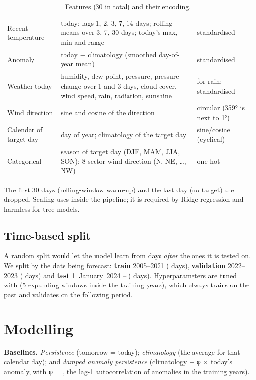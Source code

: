 \begin{table}[H]\centering\small
\caption{Features (30 in total) and their encoding.}\label{ts:tab-features}
\begin{tabularx}{\linewidth}{L{3.5cm}YL{3.4cm}}
\toprule {} &  &  \\ \midrule
Recent temperature & today; lags 1, 2, 3, 7, 14 days; rolling means over 3, 7, 30 days; today's max, min and range & standardised \\
Anomaly & today − climatology (smoothed day-of-year mean) & standardised \\
Weather today & humidity, dew point, pressure, pressure change over 1 and 3 days, cloud cover, wind speed, rain, radiation, sunshine &  for rain; standardised \\
Wind direction & sine and cosine of the direction & circular (359° is next to 1°) \\
Calendar of target day & day of year; climatology of the target day & sine/cosine (cyclical) \\
Categorical & season of target day (DJF, MAM, JJA, SON); 8-sector wind direction (N, NE, …, NW) & one-hot \\
\bottomrule
\end{tabularx}
\end{table}
The first 30 days (rolling-window warm-up) and the last day (no target) are dropped. Scaling uses  inside
the pipeline; it is required by Ridge regression and harmless for tree models.

\subsection{Time-based split}
A random split would let the model learn from days \emph{after} the ones it is tested on. We split by the date being forecast:
\textbf{train} 2005–2021 (\TSTrain{} days), \textbf{validation} 2022–2023 (\TSVal{} days) and \textbf{test} 1~January~2024 –
\TSEnd{} (\TSTest{} days). Hyperparameters are tuned with  (5 expanding windows inside the training years),
which always trains on the past and validates on the following period.

\section{Modelling}\label{ts:models}
\textbf{Baselines.} \emph{Persistence} (tomorrow = today); \emph{climatology} (the average for that calendar day); and
\emph{damped anomaly persistence} (climatology + φ × today's anomaly, with φ = \TSPhi, the lag-1 autocorrelation of anomalies
in the training years).

